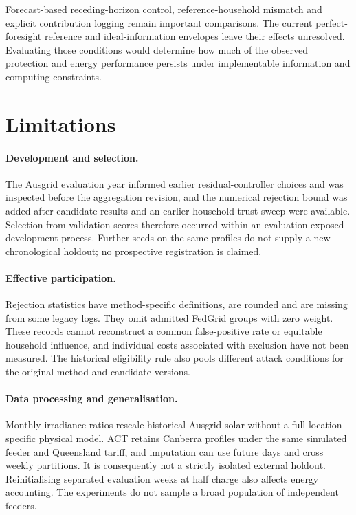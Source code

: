 \documentclass[preprint,12pt,a4paper]{elsarticle}
\begin{document}
Forecast-based receding-horizon control, reference-household mismatch and explicit contribution logging remain important comparisons. The current perfect-foresight reference and ideal-information envelopes leave their effects unresolved. Evaluating those conditions would determine how much of the observed protection and energy performance persists under implementable information and computing constraints.



\section{Limitations}
\label{sec:limitations}
\paragraph{Development and selection.}
The Ausgrid evaluation year informed earlier residual-controller choices and was inspected before the aggregation revision, and the numerical rejection bound was added after candidate results and an earlier household-trust sweep were available. Selection from validation scores therefore occurred within an evaluation-exposed development process. Further seeds on the same profiles do not supply a new chronological holdout; no prospective registration is claimed.

\paragraph{Effective participation.}
Rejection statistics have method-specific definitions, are rounded and are missing from some legacy logs. They omit admitted FedGrid groups with zero weight. These records cannot reconstruct a common false-positive rate or equitable household influence, and individual costs associated with exclusion have not been measured. The historical eligibility rule also pools different attack conditions for the original method and candidate versions.

\paragraph{Data processing and generalisation.}
Monthly irradiance ratios rescale historical Ausgrid solar without a full location-specific physical model. ACT retains Canberra profiles under the same simulated feeder and Queensland tariff, and imputation can use future days and cross weekly partitions. It is consequently not a strictly isolated external holdout. Reinitialising separated evaluation weeks at half charge also affects energy accounting. The experiments do not sample a broad population of independent feeders.
\end{document}
